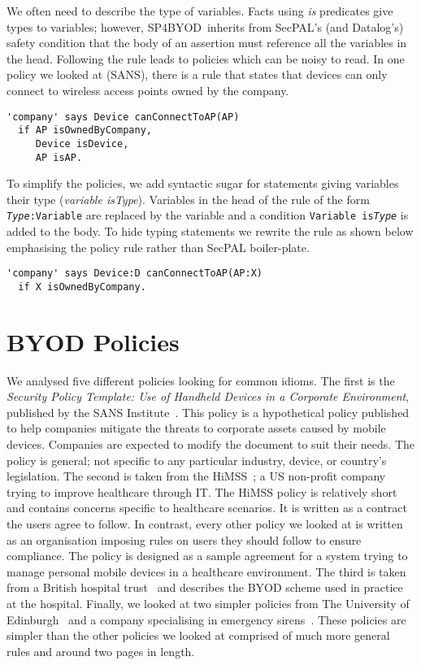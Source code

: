 \documentclass{llncs}
\newcommand{\AppPAL}[0]{SP4BYOD}
\begin{document}
We often need to describe the type of variables.
Facts using \emph{is} predicates give types to variables; 
  however, \AppPAL~inherits from SecPAL's (and Datalog's) safety condition that the body of an assertion must reference all the variables in the head.
Following the rule leads to policies which can be noisy to read.
In one policy we looked at (SANS), there is a rule that states that devices can only connect to wireless access points owned by the company.
\begin{lstlisting}
'company' says Device canConnectToAP(AP)
  if AP isOwnedByCompany,
     Device isDevice,
     AP isAP.
\end{lstlisting}
To simplify the policies, we add syntactic sugar for statements giving variables their type (\emph{variable \emph{is}Type}).
Variables in the head of the rule of the form \texttt{\emph{Type}:Variable} are replaced by the variable and a condition \texttt{Variable is\emph{Type}} is added to the body.
To hide typing statements we rewrite the rule as shown below emphasising the policy rule rather than SecPAL boiler-plate.
\begin{lstlisting}
'company' says Device:D canConnectToAP(AP:X)
  if X isOwnedByCompany.
\end{lstlisting}

\section{BYOD Policies}
\label{ssec:byod-policies}

We analysed five different policies looking for common idioms.
The first is the \emph{Security Policy Template: Use of Handheld Devices in a Corporate Environment}, published by the SANS Institute~\cite{nicholas_r._c._guerin_security_2008}.
This policy is a hypothetical policy published to help companies mitigate the threats to corporate assets caused by mobile devices.
Companies are expected to modify the document to suit their needs.
The policy is general; not specific to any particular industry, device, or country's legislation.
The second is taken from the \ac{HiMSS}~\cite{healthcare_information_and_management_systems_society_mobile_2012};
  a US non-profit company trying to improve healthcare through IT.
The \ac{HiMSS} policy is relatively short and contains concerns specific to healthcare scenarios. 
It is written as a contract the users agree to follow.
In contrast, every other policy we looked at is written as an organisation imposing rules on users they should follow to ensure compliance.
The policy is designed as a sample agreement for a system trying to manage personal mobile devices in a healthcare environment.
The third is taken from a British hospital trust~\cite{kennington_mobiles_2014} and describes the BYOD scheme used in practice at the hospital.
Finally, we looked at two simpler policies from The University of Edinburgh~\cite{williamson_bring_2015} and a company specialising in emergency sirens~\cite{code3pse.org_sample_????}.
These policies are simpler than the other policies we looked at comprised of much more general rules and around two pages in length.
\end{document}
